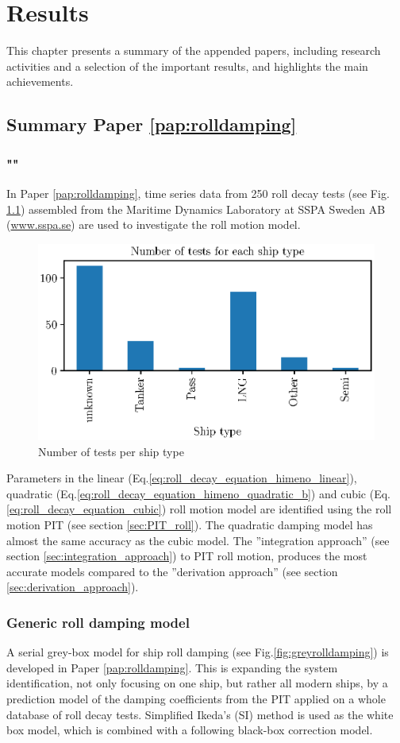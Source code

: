 \chapter{Results\label{ch:results}}
This chapter presents a summary of the appended papers, including research activities
and a selection of the important results, and highlights the main achievements.

\section{Summary Paper \ref{pap:rolldamping}}
\subsection*{""}
In Paper \ref{pap:rolldamping}, time series data from 250 roll decay tests (see Fig. \ref{fig:ship_types}) assembled from the Maritime Dynamics Laboratory at SSPA Sweden AB (\href{www.sspa.se}{www.sspa.se}) are used to investigate the roll motion model. 

\begin{figure}[H]
    \centering
    \includegraphics[width=0.5\columnwidth]{kappa/images/ship_types.eps}
    \caption{Number of tests per ship type}
    \label{fig:ship_types}
\end{figure}

\noindent Parameters in the linear (Eq.\ref{eq:roll_decay_equation_himeno_linear}), quadratic (Eq.\ref{eq:roll_decay_equation_himeno_quadratic_b}) and cubic (Eq.\ref{eq:roll_decay_equation_cubic}) roll motion model are identified using the roll motion PIT (see section \ref{sec:PIT_roll}). The quadratic damping model has almost the same accuracy as the cubic model. The ''integration approach'' (see section \ref{sec:integration_approach}) to PIT roll motion, produces the most accurate models compared to the ''derivation approach'' (see section \ref{sec:derivation_approach}).

\subsection{Generic roll damping model}
\label{sec:genericrolldampingmodel}
A serial grey-box model for ship roll damping (see Fig.\ref{fig:greyrolldamping}) is developed in Paper \ref{pap:rolldamping}. 
This is expanding the system identification, not only focusing on one ship, but rather all modern ships, by a prediction model of the damping coefficients from the PIT applied on a whole database of roll decay tests. 
Simplified Ikeda's (SI) method \cite{kawahara_simple_2011} is used as the white box model, which is combined with a following black-box correction model.

